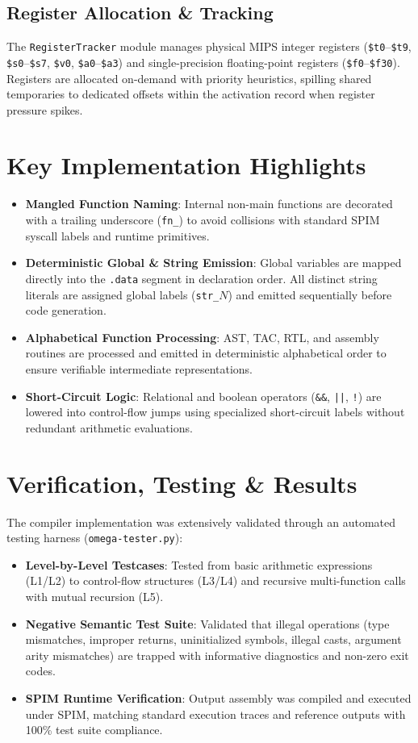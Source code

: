 \documentclass[10pt,twocolumn,a4paper]{article}
\begin{document}
\subsection{Register Allocation \& Tracking}
The \texttt{RegisterTracker} module manages physical MIPS integer registers (\texttt{\$t0}--\texttt{\$t9}, \texttt{\$s0}--\texttt{\$s7}, \texttt{\$v0}, \texttt{\$a0}--\texttt{\$a3}) and single-precision floating-point registers (\texttt{\$f0}--\texttt{\$f30}). Registers are allocated on-demand with priority heuristics, spilling shared temporaries to dedicated offsets within the activation record when register pressure spikes.

\section{Key Implementation Highlights}
\begin{itemize}
    \item \textbf{Mangled Function Naming}: Internal non-main functions are decorated with a trailing underscore (\texttt{fn\_}) to avoid collisions with standard SPIM syscall labels and runtime primitives.
    \item \textbf{Deterministic Global \& String Emission}: Global variables are mapped directly into the \texttt{.data} segment in declaration order. All distinct string literals are assigned global labels (\texttt{str\_$N$}) and emitted sequentially before code generation.
    \item \textbf{Alphabetical Function Processing}: AST, TAC, RTL, and assembly routines are processed and emitted in deterministic alphabetical order to ensure verifiable intermediate representations.
    \item \textbf{Short-Circuit Logic}: Relational and boolean operators (\texttt{\&\&}, \texttt{||}, \texttt{!}) are lowered into control-flow jumps using specialized short-circuit labels without redundant arithmetic evaluations.
\end{itemize}

\section{Verification, Testing \& Results}
The compiler implementation was extensively validated through an automated testing harness (\texttt{omega-tester.py}):
\begin{itemize}
    \item \textbf{Level-by-Level Testcases}: Tested from basic arithmetic expressions (L1/L2) to control-flow structures (L3/L4) and recursive multi-function calls with mutual recursion (L5).
    \item \textbf{Negative Semantic Test Suite}: Validated that illegal operations (type mismatches, improper returns, uninitialized symbols, illegal casts, argument arity mismatches) are trapped with informative diagnostics and non-zero exit codes.
    \item \textbf{SPIM Runtime Verification}: Output assembly was compiled and executed under SPIM, matching standard execution traces and reference outputs with 100\% test suite compliance.
\end{itemize}
\end{document}
